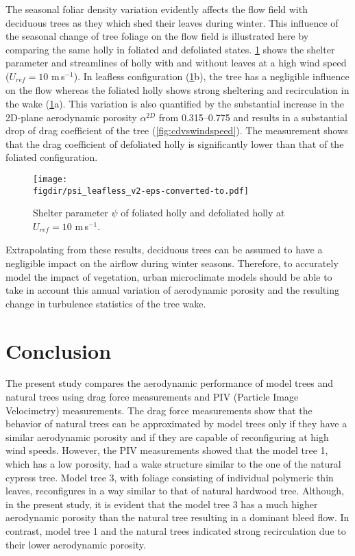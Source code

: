The seasonal foliar density variation evidently affects the flow field with deciduous trees as they which shed their leaves during winter. This influence of the seasonal change of tree foliage on the flow field is illustrated here by comparing the same holly in foliated and defoliated states. \cref{fig:psileafless} shows the shelter parameter and streamlines of holly with and without leaves at a high wind speed ($U_{\textit{ref}}=10$ m\,s$^{-1}$). In leafless configuration (\cref{fig:psileafless}b), the tree has a negligible influence on the flow whereas the foliated holly shows strong sheltering and recirculation in the wake (\cref{fig:psileafless}a). This variation is also quantified by the substantial increase in the 2D-plane aerodynamic porosity $\alpha^{2D}$ from \numrange{0.315}{0.775} and results in a substantial drop of drag coefficient of the tree (\cref{fig:cdvswindspeed}). The measurement shows that the drag coefficient of defoliated holly is significantly lower than that of the foliated configuration. 

	\begin{figure}[t]
	\centering
	\texttt{[image: \\figdir/psi\_leafless\_v2-eps-converted-to.pdf]}
	\caption{Shelter parameter $\psi$ of  foliated holly and  defoliated holly at $U_{\textit{ref}}=10$ m\,s$^{-1}$.}
	\label{fig:psileafless}
	\end{figure}

Extrapolating from these results, deciduous trees can be assumed to have a negligible impact on the airflow during winter seasons. Therefore, to accurately model the impact of vegetation, urban microclimate models should be able to take in account this annual variation of aerodynamic porosity and the resulting change in turbulence statistics of the tree wake.

\section{Conclusion}

The present study compares the aerodynamic performance of model trees and natural trees using drag force measurements and PIV (Particle Image Velocimetry) measurements. The drag force measurements show that the behavior of natural trees can be approximated by model trees only if they have a similar aerodynamic porosity and if they are capable of reconfiguring at high wind speeds. However, the PIV measurements showed that the model tree 1, which has a low porosity, had a wake structure similar to the one of the natural cypress tree. Model tree 3, with foliage consisting of individual polymeric thin leaves, reconfigures in a way similar to that of natural hardwood tree. Although, in the present study, it is evident that the model tree 3 has a much higher aerodynamic porosity than the natural tree resulting in a dominant bleed flow. In contrast, model tree 1 and the natural trees indicated strong recirculation due to their lower aerodynamic porosity.

